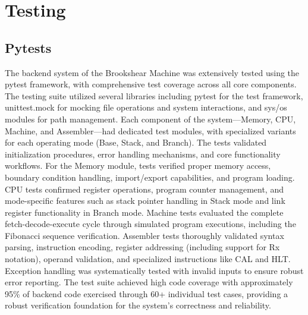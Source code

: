 \section{Testing}

\subsection{Pytests}
The backend system of the Brookshear Machine was extensively tested using the pytest framework, with comprehensive test coverage across all core components. The testing suite utilized several libraries including pytest for the test framework, unittest.mock for mocking file operations and system interactions, and sys/os modules for path management. Each component of the system—Memory, CPU, Machine, and Assembler—had dedicated test modules, with specialized variants for each operating mode (Base, Stack, and Branch). The tests validated initialization procedures, error handling mechanisms, and core functionality workflows. For the Memory module, tests verified proper memory access, boundary condition handling, import/export capabilities, and program loading. CPU tests confirmed register operations, program counter management, and mode-specific features such as stack pointer handling in Stack mode and link register functionality in Branch mode. Machine tests evaluated the complete fetch-decode-execute cycle through simulated program executions, including the Fibonacci sequence verification. Assembler tests thoroughly validated syntax parsing, instruction encoding, register addressing (including support for Rx notation), operand validation, and specialized instructions like CAL and HLT. Exception handling was systematically tested with invalid inputs to ensure robust error reporting. The test suite achieved high code coverage with approximately 95\% of backend code exercised through 60+ individual test cases, providing a robust verification foundation for the system's correctness and reliability.



